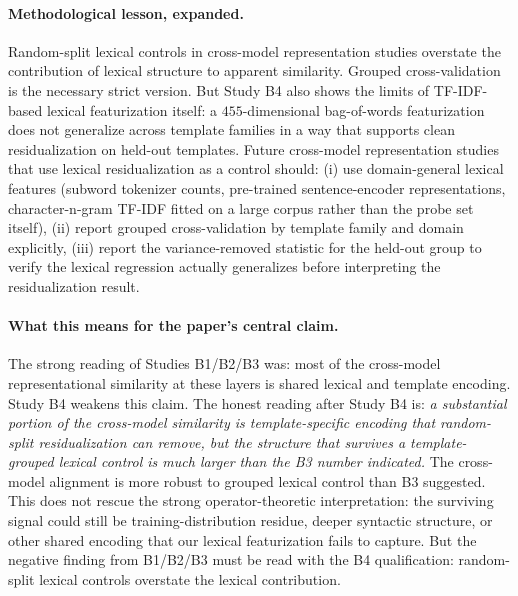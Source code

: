 \paragraph{Methodological lesson, expanded.} Random-split lexical
controls in cross-model representation studies overstate the
contribution of lexical structure to apparent similarity. Grouped
cross-validation is the necessary strict version. But Study B4 also
shows the limits of TF-IDF-based lexical featurization itself: a
$455$-dimensional bag-of-words featurization does not generalize
across template families in a way that supports clean residualization
on held-out templates. Future cross-model representation studies that
use lexical residualization as a control should: (i) use
domain-general lexical features (subword tokenizer counts,
pre-trained sentence-encoder representations, character-n-gram TF-IDF
fitted on a large corpus rather than the probe set itself),
(ii) report grouped cross-validation by template family and domain
explicitly, (iii) report the variance-removed statistic for the
held-out group to verify the lexical regression actually generalizes
before interpreting the residualization result.

\paragraph{What this means for the paper's central claim.} The
strong reading of Studies B1/B2/B3 was: most of the cross-model
representational similarity at these layers is shared lexical and
template encoding. Study B4 weakens this claim. The honest reading
after Study B4 is: \emph{a substantial portion of the cross-model
similarity is template-specific encoding that random-split
residualization can remove, but the structure that survives a
template-grouped lexical control is much larger than the B3 number
indicated.} The cross-model alignment is more robust to grouped
lexical control than B3 suggested. This does not rescue the strong
operator-theoretic interpretation: the surviving signal could still
be training-distribution residue, deeper syntactic structure, or
other shared encoding that our lexical featurization fails to capture.
But the negative finding from B1/B2/B3 must be read with the B4
qualification: random-split lexical controls overstate the lexical
contribution.
